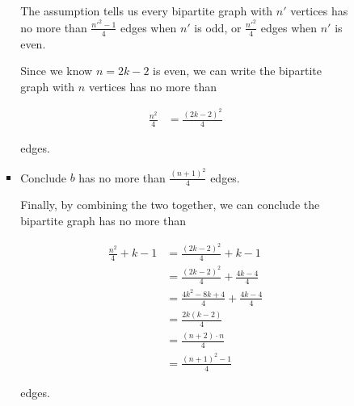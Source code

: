 \documentclass[12pt]{article}
\begin{document}
\begin{enumerate}[a.]
\begin{mdframed}
\begin{enumerate}[1.]
\begin{enumerate}[1.]
\begin{itemize}
\begin{mdframed}
                    \bigskip

                    The assumption tells us every bipartite graph with $n'$ vertices
                    has no more than $\frac{n'^2-1}{4}$ edges when $n'$ is odd, or
                    $\frac{n'^2}{4}$ edges when $n'$ is even.

                    \bigskip

                    Since we know $n = 2k - 2$ is even, we can write the bipartite
                    graph with $n$ vertices has no more than

                    \begin{align}
                        \frac{n^2}{4} &= \frac{(2k-2)^2}{4}
                    \end{align}

                    edges.
                    \end{mdframed}

                    \item Conclude $b$ has no more than $\frac{(n+1)^2}{4}$ edges.

                    \begin{mdframed}
                    Finally, by combining the two together, we can conclude the
                    bipartite graph has no more than

                    \begin{align}
                        \frac{n^2}{4} + k-1 &= \frac{(2k-2)^2}{4} + k-1\\
                        &= \frac{(2k-2)^2}{4} + \frac{4k-4}{4}\\
                        &= \frac{4k^2-8k+4}{4} + \frac{4k-4}{4}\\
                        &= \frac{2k(k-2)}{4}\\
                        &= \frac{(n+2) \cdot n}{4}\\
                        &= \frac{(n+1)^2 - 1}{4}
                    \end{align}

                    edges.

                    \bigskip

                    \end{mdframed}
                \end{itemize}
            \end{enumerate}

        \end{enumerate}

    \end{mdframed}
\end{enumerate}
\end{document}
